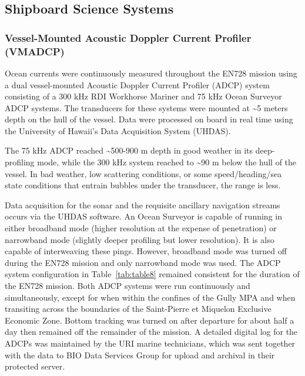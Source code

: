 \documentclass[12pt]{article}\usepackage[]{graphicx}\usepackage[]{color}
\begin{document}
\subsection{Shipboard Science Systems}\label{shipboard_systems}

\subsubsection{Vessel-Mounted Acoustic Doppler Current Profiler (VMADCP)}\label{vessel-mounted-acoustic-doppler-current-profiler-vmadcp}

Ocean currents were continuously measured throughout the EN728 mission using a dual vessel-mounted Acoustic Doppler Current Profiler (ADCP) system consisting of a 300 kHz RDI Workhorse Mariner and 75 kHz Ocean Surveyor ADCP systems. The transducers for these systems were mounted at \textasciitilde5 meters depth on the hull of the vessel. Data were processed on board in real time using the University of Hawaii's Data Acquisition System (UHDAS).

The 75 kHz ADCP reached \textasciitilde500-900 m depth in good weather in its deep-profiling mode, while the 300 kHz system reached to \textasciitilde90 m below the hull of the vessel. In bad weather, low scattering conditions, or some speed/heading/sea state conditions that entrain bubbles under the transducer, the range is less.

Data acquisition for the sonar and the requisite ancillary navigation streams occurs via the UHDAS software. An Ocean Surveyor is capable of running in either broadband mode (higher resolution at the expense of penetration) or narrowband mode (slightly deeper profiling but lower resolution). It is also capable of interweaving these pings. However, broadband mode was turned off during the EN728 mission and only narrowband mode was used. The ADCP system configuration in Table~\ref{tab:table8} remained consistent for the duration of the EN728 mission. Both ADCP systems were run continuously and simultaneously, except for when within the confines of the Gully MPA and when transiting across the boundaries of the Saint-Pierre et Miquelon Exclusive Economic Zone. Bottom tracking was turned on after departure for about half a day then remained off the remainder of the mission. A detailed digital log for the ADCPs was maintained by the URI marine technicians, which was sent together with the data to BIO Data Services Group for upload and archival in their protected server.
\end{document}

